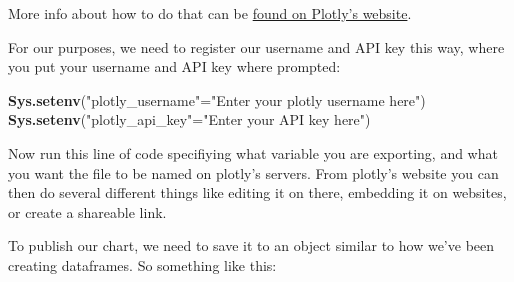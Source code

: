 \documentclass[]{book}
\newenvironment{Shaded}{\begin{snugshade}}{\end{snugshade}}
\newcommand{\DataTypeTok}[1]{\textcolor[rgb]{0.13,0.29,0.53}{#1}}
\newcommand{\KeywordTok}[1]{\textcolor[rgb]{0.13,0.29,0.53}{\textbf{#1}}}
\newcommand{\NormalTok}[1]{#1}
\newcommand{\OperatorTok}[1]{\textcolor[rgb]{0.81,0.36,0.00}{\textbf{#1}}}
\newcommand{\StringTok}[1]{\textcolor[rgb]{0.31,0.60,0.02}{#1}}
\begin{document}
More info about how to do that can be \href{https://plot.ly/r/getting-started/\#initialization-for-online-plotting}{found on Plotly's website}.

For our purposes, we need to register our username and API key this way, where you put your username and API key where prompted:

\begin{Shaded}
\begin{Highlighting}[]
\KeywordTok{Sys.setenv}\NormalTok{(}\StringTok{"plotly_username"}\NormalTok{=}\StringTok{"Enter your plotly username here"}\NormalTok{)}
\KeywordTok{Sys.setenv}\NormalTok{(}\StringTok{"plotly_api_key"}\NormalTok{=}\StringTok{"Enter your API key here"}\NormalTok{)}
\end{Highlighting}
\end{Shaded}

Now run this line of code specifiying what variable you are exporting, and what you want the file to be named on plotly's servers. From plotly's website you can then do several different things like editing it on there, embedding it on websites, or create a shareable link.

To publish our chart, we need to save it to an object similar to how we've been creating dataframes. So something like this:

\begin{Shaded}
\end{Shaded}
\end{document}
